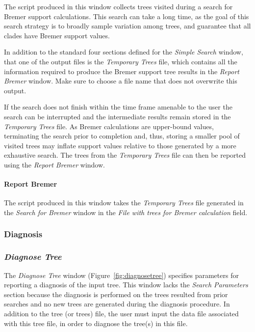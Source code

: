 {The script produced in this window collects trees visited during a search for Bremer support calculations. This
search can take a long time, as the goal of this search strategy is to broadly sample variation among trees, and guarantee that all
clades have Bremer support values.  

In addition to the standard four sections defined for the \emph{Simple Search} window,
that one of the output files is the \emph{Temporary Trees} file, which 
contains all the information required to produce the Bremer support tree
results in the \emph{Report Bremer} window. Make sure to choose a file 
name that does not overwrite this output.

If the search does not finish within the time frame amenable to the user the search can be interrupted and the 
intermediate results remain stored in the \emph{Temporary Trees} file.  As Bremer calculations are upper-bound 
values, terminating the search prior to completion and, thus, storing a smaller pool of visited trees may inflate 
support values relative to those generated by a more exhaustive search. The trees from the \emph{Temporary Trees} 
file can then be reported using the \emph{Report Bremer} window.

\paragraph{Report Bremer}
The script produced in this window takes the \emph{Temporary Trees} file generated in the \emph{Search for Bremer} 
window in the \emph{File with trees for Bremer calculation} field. 

\subsubsection{Diagnosis}
\subsubsection*{\emph{Diagnose Tree}}

The \emph{Diagnose Tree} window (Figure~\ref{fig:diagnosetree}) specifies parameters for reporting a diagnosis 
of the input tree. This window lacks the \emph{Search Parameters} section because the diagnosis is performed on 
the trees resulted from prior searches and no new trees are generated during the diagnosis procedure. In addition
to the tree (or trees) file, the user must input the data file associated with this tree file, in order to diagnose
the tree(s) in this file.

}
